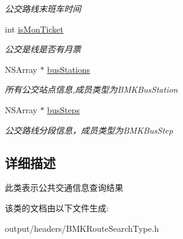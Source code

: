 \begin{DoxyCompactItemize}
\begin{DoxyCompactList}\small\item\em 公交路线末班车时间 \end{DoxyCompactList}\item 
\hypertarget{interface_b_m_k_bus_line_result_a2c311dc1e3378a192ffacdb2c3654ade}{}int \hyperlink{interface_b_m_k_bus_line_result_a2c311dc1e3378a192ffacdb2c3654ade}{is\+Mon\+Ticket}\label{interface_b_m_k_bus_line_result_a2c311dc1e3378a192ffacdb2c3654ade}

\begin{DoxyCompactList}\small\item\em 公交是线是否有月票 \end{DoxyCompactList}\item 
\hypertarget{interface_b_m_k_bus_line_result_a9fe3884161bea9c3955a65eebbb00d70}{}N\+S\+Array $\ast$ \hyperlink{interface_b_m_k_bus_line_result_a9fe3884161bea9c3955a65eebbb00d70}{bus\+Stations}\label{interface_b_m_k_bus_line_result_a9fe3884161bea9c3955a65eebbb00d70}

\begin{DoxyCompactList}\small\item\em 所有公交站点信息,成员类型为\+B\+M\+K\+Bus\+Station \end{DoxyCompactList}\item 
\hypertarget{interface_b_m_k_bus_line_result_acbb640c72f6b2649ee131c95fd826407}{}N\+S\+Array $\ast$ \hyperlink{interface_b_m_k_bus_line_result_acbb640c72f6b2649ee131c95fd826407}{bus\+Steps}\label{interface_b_m_k_bus_line_result_acbb640c72f6b2649ee131c95fd826407}

\begin{DoxyCompactList}\small\item\em 公交路线分段信息，成员类型为\+B\+M\+K\+Bus\+Step \end{DoxyCompactList}\end{DoxyCompactItemize}


\subsection{详细描述}
此类表示公共交通信息查询结果 

该类的文档由以下文件生成\+:\begin{DoxyCompactItemize}
\item 
output/headers/B\+M\+K\+Route\+Search\+Type.\+h\end{DoxyCompactItemize}
